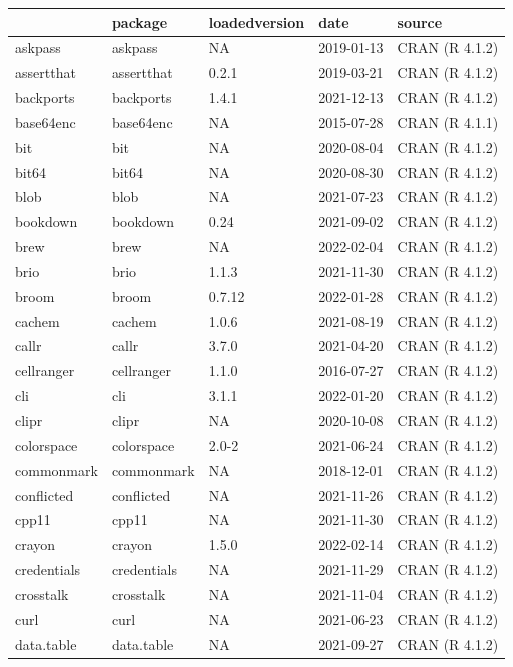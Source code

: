 \begin{tabular}{lllll}
\toprule
  & package & loadedversion & date & source\\
\midrule
askpass & askpass & NA & 2019-01-13 & CRAN (R 4.1.2)\\
assertthat & assertthat & 0.2.1 & 2019-03-21 & CRAN (R 4.1.2)\\
backports & backports & 1.4.1 & 2021-12-13 & CRAN (R 4.1.2)\\
base64enc & base64enc & NA & 2015-07-28 & CRAN (R 4.1.1)\\
bit & bit & NA & 2020-08-04 & CRAN (R 4.1.2)\\
\addlinespace
bit64 & bit64 & NA & 2020-08-30 & CRAN (R 4.1.2)\\
blob & blob & NA & 2021-07-23 & CRAN (R 4.1.2)\\
bookdown & bookdown & 0.24 & 2021-09-02 & CRAN (R 4.1.2)\\
brew & brew & NA & 2022-02-04 & CRAN (R 4.1.2)\\
brio & brio & 1.1.3 & 2021-11-30 & CRAN (R 4.1.2)\\
\addlinespace
broom & broom & 0.7.12 & 2022-01-28 & CRAN (R 4.1.2)\\
cachem & cachem & 1.0.6 & 2021-08-19 & CRAN (R 4.1.2)\\
callr & callr & 3.7.0 & 2021-04-20 & CRAN (R 4.1.2)\\
cellranger & cellranger & 1.1.0 & 2016-07-27 & CRAN (R 4.1.2)\\
cli & cli & 3.1.1 & 2022-01-20 & CRAN (R 4.1.2)\\
\addlinespace
clipr & clipr & NA & 2020-10-08 & CRAN (R 4.1.2)\\
colorspace & colorspace & 2.0-2 & 2021-06-24 & CRAN (R 4.1.2)\\
commonmark & commonmark & NA & 2018-12-01 & CRAN (R 4.1.2)\\
conflicted & conflicted & NA & 2021-11-26 & CRAN (R 4.1.2)\\
cpp11 & cpp11 & NA & 2021-11-30 & CRAN (R 4.1.2)\\
\addlinespace
crayon & crayon & 1.5.0 & 2022-02-14 & CRAN (R 4.1.2)\\
credentials & credentials & NA & 2021-11-29 & CRAN (R 4.1.2)\\
crosstalk & crosstalk & NA & 2021-11-04 & CRAN (R 4.1.2)\\
curl & curl & NA & 2021-06-23 & CRAN (R 4.1.2)\\
data.table & data.table & NA & 2021-09-27 & CRAN (R 4.1.2)\\

\end{tabular}
